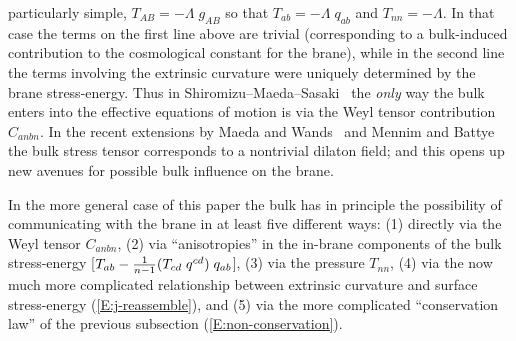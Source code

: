 \documentclass[a4paper,10pt]{article}
\begin{document}
{particularly simple, $T_{AB} = -\Lambda \; g_{AB}$ so that $T_{ab} =
-\Lambda \; q_{ab}$ and $T_{nn} = -\Lambda$. In that case the terms on
the first line above are trivial (corresponding to a bulk-induced
contribution to the cosmological constant for the brane), while in the
second line the terms involving the extrinsic curvature were uniquely
determined by the brane stress-energy.  Thus in
Shiromizu--Maeda--Sasaki~\cite{Shiromizu} the {\emph{only}} way the
bulk enters into the effective equations of motion is via the Weyl
tensor contribution $C_{anbn}$.  In the recent extensions by Maeda and
Wands~\cite{Wands} and Mennim and Battye~\cite{Mennim} the bulk stress
tensor corresponds to a nontrivial dilaton field; and this opens up
new avenues for possible bulk influence on the brane.

In the more general case of this paper the bulk has in principle the
possibility of communicating with the brane in at least five different
ways: (1) directly via the Weyl tensor $C_{anbn}$, (2) via
``anisotropies'' in the in-brane components of the bulk stress-energy
[$T_{ab} - {1\over n-1} (T_{cd}\; q^{cd}) \; q_{ab}$], (3) via the
pressure $T_{nn}$, (4) via the now much more complicated relationship
between extrinsic curvature and surface stress-energy
(\ref{E:j-reassemble}), and (5) via the more complicated
``conservation law'' of the previous subsection
(\ref{E:non-conservation}).

}
\end{document}
